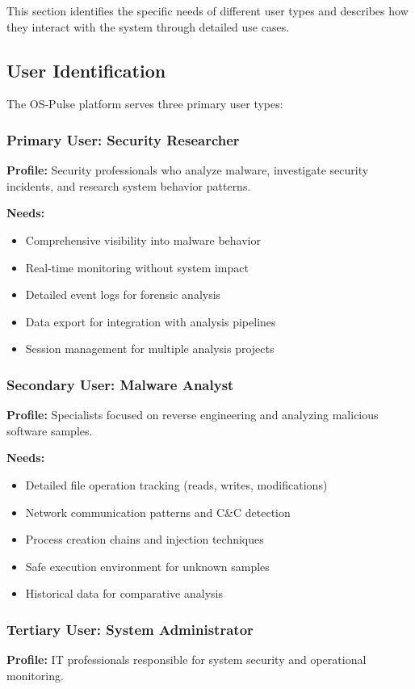 This section identifies the specific needs of different user types and describes how they interact with the system through detailed use cases.

\subsection{User Identification}

The OS-Pulse platform serves three primary user types:

\subsubsection{Primary User: Security Researcher}
\textbf{Profile:} Security professionals who analyze malware, investigate security incidents, and research system behavior patterns.

\textbf{Needs:}
\begin{itemize}
    \item Comprehensive visibility into malware behavior
    \item Real-time monitoring without system impact
    \item Detailed event logs for forensic analysis
    \item Data export for integration with analysis pipelines
    \item Session management for multiple analysis projects
\end{itemize}

\subsubsection{Secondary User: Malware Analyst}
\textbf{Profile:} Specialists focused on reverse engineering and analyzing malicious software samples.

\textbf{Needs:}
\begin{itemize}
    \item Detailed file operation tracking (reads, writes, modifications)
    \item Network communication patterns and C\&C detection
    \item Process creation chains and injection techniques
    \item Safe execution environment for unknown samples
    \item Historical data for comparative analysis
\end{itemize}

\subsubsection{Tertiary User: System Administrator}
\textbf{Profile:} IT professionals responsible for system security and operational monitoring.

